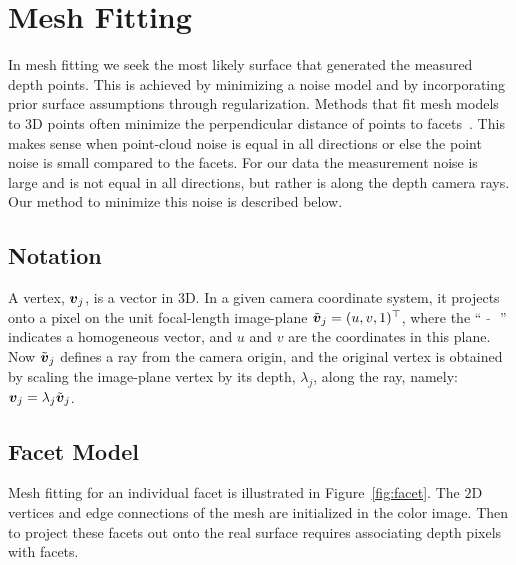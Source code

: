 \section{Mesh Fitting}
\label{sec:fitting}

In mesh fitting we seek the most likely surface that generated the measured depth points.  This is achieved by minimizing a noise model and by incorporating prior surface assumptions through regularization.  Methods that fit mesh models to 3D points often minimize the perpendicular distance of points to facets~\cite{Sienz2000}.  This makes sense when point-cloud noise is equal in all directions or else the point noise is small compared to the facets.  For our data the measurement noise is large and is not equal in all directions, but rather is along the depth camera rays.  Our method to minimize this noise is described below.


\subsection{Notation}

A vertex, $\boldsymbol{v}_j$, is a vector in $3$D.  In a given camera coordinate system, it projects onto a pixel on the unit focal-length image-plane $\tilde{\boldsymbol{v}}_j=(u,v,1)^\top$, where the `` $\tilde{\text{ }}$ '' indicates a homogeneous vector, and $u$ and $v$ are the coordinates in this plane.  Now $\tilde{\boldsymbol{v}}_j$ defines a ray from the camera origin, and the original vertex is obtained by scaling the image-plane vertex by its depth, $\lambda_j$, along the ray, namely: $\boldsymbol{v}_j = \lambda_j\tilde{\boldsymbol{v}}_j$. 

\subsection{Facet Model}

Mesh fitting for an individual facet is illustrated in Figure~\ref{fig:facet}.  The $2$D vertices and edge connections of the mesh are initialized in the color image.  Then to project these facets out onto the real surface requires associating depth pixels with facets.

